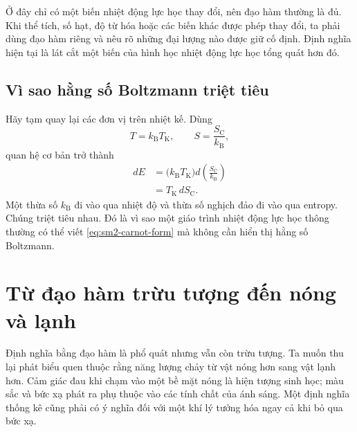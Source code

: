 Ở đây chỉ có một biến nhiệt động lực học thay đổi, nên đạo hàm thường là đủ. Khi thể tích, số hạt, độ từ hóa hoặc các biến khác được phép thay đổi, ta phải dùng đạo hàm riêng và nêu rõ những đại lượng nào được giữ cố định. Định nghĩa hiện tại là lát cắt một biến của hình học nhiệt động lực học tổng quát hơn đó.

\subsection{Vì sao hằng số Boltzmann triệt tiêu}

Hãy tạm quay lại các đơn vị trên nhiệt kế. Dùng
\[
 T=k_{\mathrm B}T_{\mathrm K},
 \qquad
 S=\frac{S_{\mathrm C}}{k_{\mathrm B}},
\]
quan hệ cơ bản trở thành
\begin{align}
 dE
 &=\bigl(k_{\mathrm B}T_{\mathrm K}\bigr)
   d\left(\frac{S_{\mathrm C}}{k_{\mathrm B}}\right)\\
 &=T_{\mathrm K}\,dS_{\mathrm C}.
 \label{eq:sm2-carnot-form}
\end{align}
Một thừa số \(k_{\mathrm B}\) đi vào qua nhiệt độ và thừa số nghịch đảo đi vào qua entropy. Chúng triệt tiêu nhau. Đó là vì sao một giáo trình nhiệt động lực học thông thường có thể viết \eqref{eq:sm2-carnot-form} mà không cần hiển thị hằng số Boltzmann.

\begin{classroomqa}
\end{classroomqa}

\section{Từ đạo hàm trừu tượng đến nóng và lạnh}

Định nghĩa bằng đạo hàm là phổ quát nhưng vẫn còn trừu tượng. Ta muốn thu lại phát biểu quen thuộc rằng năng lượng chảy từ vật nóng hơn sang vật lạnh hơn. Cảm giác đau khi chạm vào một bề mặt nóng là hiện tượng sinh học; màu sắc và bức xạ phát ra phụ thuộc vào các tính chất của ánh sáng. Một định nghĩa thống kê cũng phải có ý nghĩa đối với một khí lý tưởng hóa ngay cả khi bỏ qua bức xạ.

